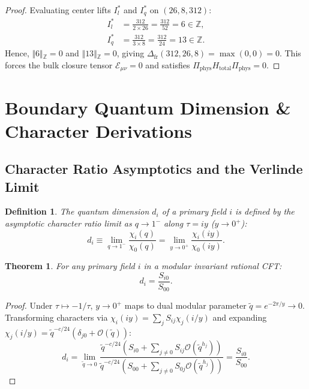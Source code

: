 \documentclass[11pt]{article}
\theoremstyle{plain}
\newtheorem{theorem}{Theorem}
\newtheorem{definition}{Definition}
\begin{document}
\begin{proof}
Evaluating center lifts $I_l^*$ and $I_q^*$ on $(26, 8, 312)$:
\begin{align}
I_l^* &= \frac{312}{2 \times 26} = \frac{312}{52} = 6 \in \mathbb{Z}, \\
I_q^* &= \frac{312}{3 \times 8} = \frac{312}{24} = 13 \in \mathbb{Z}.
\end{align}
Hence, $\Vert{}6\Vert{}_{\mathbb{Z}} = 0$ and $\Vert{}13\Vert{}_{\mathbb{Z}} = 0$, giving $\Delta_{\text{fr}}(312, 26, 8) = \max(0, 0) = 0$. This forces the bulk closure tensor $\mathcal{E}_{\mu\nu} = 0$ and satisfies $\Pi_{\text{phys}} H_{\text{total}} \Pi_{\text{phys}} = 0$.
\end{proof}

\section{Boundary Quantum Dimension \& Character Derivations}
\label{sec:quantum_dimension_derivation}
\label{app:boundary-measure-quantum-dimensions}

\subsection{Character Ratio Asymptotics and the Verlinde Limit}
\begin{definition}
The quantum dimension $d_i$ of a primary field $i$ is defined by the asymptotic character ratio limit as $q \to 1^-$ along $\tau = i y$ ($y \to 0^+$):
\begin{equation}
d_i \equiv \lim_{q \to 1^-} \frac{\chi_i(q)}{\chi_0(q)} = \lim_{y \to 0^+} \frac{\chi_i(i y)}{\chi_0(i y)}.
\end{equation}
\end{definition}

\begin{theorem}
For any primary field $i$ in a modular invariant rational CFT:
\begin{equation}
d_i = \frac{S_{i0}}{S_{00}}.
\end{equation}
\end{theorem}

\begin{proof}
Under $\tau \mapsto -1/\tau$, $y \to 0^+$ maps to dual modular parameter $\tilde{q} = e^{-2\pi/y} \to 0$. Transforming characters via $\chi_i(i y) = \sum_{j} S_{ij} \chi_j(i / y)$ and expanding $\chi_j(i/y) = \tilde{q}^{-c/24} (\delta_{j0} + \mathcal{O}(\tilde{q}))$:
\begin{equation}
d_i = \lim_{\tilde{q} \to 0} \frac{\tilde{q}^{-c/24} \left( S_{i0} + \sum_{j \neq 0} S_{ij} \mathcal{O}(\tilde{q}^{h_j}) \right)}{\tilde{q}^{-c/24} \left( S_{00} + \sum_{j \neq 0} S_{0j} \mathcal{O}(\tilde{q}^{h_j}) \right)} = \frac{S_{i0}}{S_{00}}.
\end{equation}
\end{proof}
\end{document}
